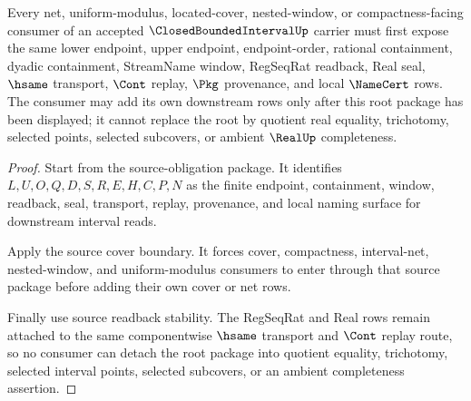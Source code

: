 \begin{theorem}
\label{thm:closed-bounded-interval-root-consumer-obligations}
Every net, uniform-modulus, located-cover, nested-window, or compactness-facing consumer of an accepted $\ClosedBoundedIntervalUp$ carrier must first expose the same lower endpoint, upper endpoint, endpoint-order, rational containment, dyadic containment, StreamName window, RegSeqRat readback, Real seal, $\hsame$ transport, $\Cont$ replay, $\Pkg$ provenance, and local $\NameCert$ rows. The consumer may add its own downstream rows only after this root package has been displayed; it cannot replace the root by quotient real equality, trichotomy, selected points, selected subcovers, or ambient $\RealUp$ completeness.
\end{theorem}
\begin{proof}
Start from the source-obligation package. It identifies $L,U,O,Q,D,S,R,E,H,C,P,N$ as the finite endpoint, containment, window, readback, seal, transport, replay, provenance, and local naming surface for downstream interval reads.

Apply the source cover boundary. It forces cover, compactness, interval-net, nested-window, and uniform-modulus consumers to enter through that source package before adding their own cover or net rows.

Finally use source readback stability. The RegSeqRat and Real rows remain attached to the same componentwise $\hsame$ transport and $\Cont$ replay route, so no consumer can detach the root package into quotient equality, trichotomy, selected interval points, selected subcovers, or an ambient completeness assertion.
\end{proof}

